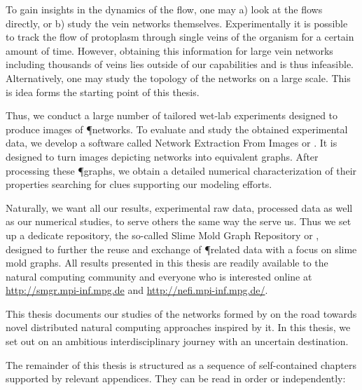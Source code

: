 	To gain insights in the dynamics of the flow, one may a) look at the flows directly, or b) study the vein networks themselves. Experimentally it is possible to track the flow of protoplasm through single veins of the organism for a certain amount of time. However, obtaining this information for large vein networks including thousands of veins lies outside of our capabilities and is thus infeasible. Alternatively, one may study the topology of the networks on a large scale. This is idea forms the starting point of this thesis. 

	Thus, we conduct a large number of tailored wet-lab experiments designed to produce images of \P networks. To evaluate and study the obtained experimental data, we develop a software called Network Extraction From Images or \NEFI. It is designed to turn images depicting networks into equivalent graphs. After processing these \P graphs, we obtain a detailed numerical characterization of their properties searching for clues supporting our modeling efforts. 

	Naturally, we want all our results, \ie experimental raw data, processed data as well as our numerical studies, to serve others the same way the serve us. Thus we set up a dedicate repository, the so-called Slime Mold Graph Repository or \SMGR, designed to further the reuse and exchange of \P related data with a focus on slime mold graphs. All results presented in this thesis are readily available to the natural computing community and everyone who is interested online at \href{http://smgr.mpi-inf.mpg.de}{http://smgr.mpi-inf.mpg.de} and \href{http://nefi.mpi-inf.mpg.de/}{http://nefi.mpi-inf.mpg.de/}.

	This thesis documents our studies of the networks formed by \Pp on the road towards novel distributed natural computing approaches inspired by it. In this thesis, we set out on an ambitious interdisciplinary journey with an uncertain destination.

	The remainder of this thesis is structured as a sequence of self-contained chapters supported by relevant appendices. They can be read in order or independently:\vspace{\baselineskip}

